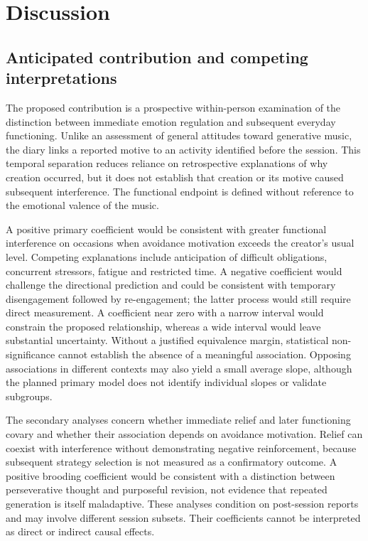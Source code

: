 \documentclass[11pt]{article}
\begin{document}
\section{Discussion}
\subsection{Anticipated contribution and competing interpretations}
The proposed contribution is a prospective within-person examination of the distinction between immediate emotion regulation and subsequent everyday functioning. Unlike an assessment of general attitudes toward generative music, the diary links a reported motive to an activity identified before the session. This temporal separation reduces reliance on retrospective explanations of why creation occurred, but it does not establish that creation or its motive caused subsequent interference. The functional endpoint is defined without reference to the emotional valence of the music.

A positive primary coefficient would be consistent with greater functional interference on occasions when avoidance motivation exceeds the creator's usual level. Competing explanations include anticipation of difficult obligations, concurrent stressors, fatigue and restricted time. A negative coefficient would challenge the directional prediction and could be consistent with temporary disengagement followed by re-engagement; the latter process would still require direct measurement. A coefficient near zero with a narrow interval would constrain the proposed relationship, whereas a wide interval would leave substantial uncertainty. Without a justified equivalence margin, statistical non-significance cannot establish the absence of a meaningful association. Opposing associations in different contexts may also yield a small average slope, although the planned primary model does not identify individual slopes or validate subgroups.

The secondary analyses concern whether immediate relief and later functioning covary and whether their association depends on avoidance motivation. Relief can coexist with interference without demonstrating negative reinforcement, because subsequent strategy selection is not measured as a confirmatory outcome. A positive brooding coefficient would be consistent with a distinction between perseverative thought and purposeful revision, not evidence that repeated generation is itself maladaptive. These analyses condition on post-session reports and may involve different session subsets. Their coefficients cannot be interpreted as direct or indirect causal effects.
\end{document}
